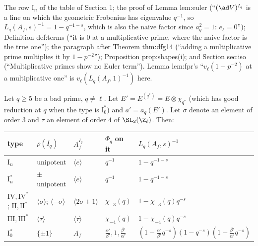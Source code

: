 \begin{paperlink}
The row $\mathrm I_n$ of the table of Section 1; the proof of Lemma lem:euler (``$(\ad V)^{I_q}$ is a line on which the geometric Frobenius has eigenvalue $q^{-1}$, so
$L_q(A_f,s)^{-1}=1-q^{-1-s}$, which is also the naive factor since $a_q^2=1$: $e_\ell=0$''); Definition def:terms (``it is $0$ at a multiplicative prime, where the naive
factor is the true one''); the paragraph after Theorem thm:dfg14 (``adding a multiplicative prime multiplies it by $1-p^{-2}$''); Proposition prop:shapes(i); and Section
sec:iso (``Multiplicative primes show no Euler term''). Lemma lem:fpr's ``$v_\ell(1-p^{-2})$ at a multiplicative one'' is $v_\ell(L_q(A_f,1)^{-1})$ here.
\end{paperlink}

\begin{lemma}\label{lem:lfunctions:euler}
Let $q\ge5$ be a bad prime, $q\ne\ell$. Let $E'=E^{(q^*)}=E\otimes\chi_{q^*}$ (which has good reduction at $q$ when the type is $\mathrm I_0^*$) and $a'=a_q(E')$. Let $\sigma$ denote an element
of order $3$ and $\tau$ an element of order $4$ of $\SL_2(\Z_\ell)$. Then:
\begin{center}\footnotesize\setlength{\tabcolsep}{4pt}
\begin{tabular}{lllll}
\toprule
type & $\rho(I_q)$ & $A_f^{I_q}$ & $\Phi_q$ on it & $L_q(A_f,s)^{-1}$\\
\midrule
$\mathrm I_n$ & unipotent & $\langle e\rangle$ & $q^{-1}$ & $1-q^{-1-s}$\\
$\mathrm I_n^*$ & $\pm$unipotent & $\langle e\rangle$ & $q^{-1}$ & $1-q^{-1-s}$\\
$\mathrm{IV},\mathrm{IV}^*$; $\mathrm{II},\mathrm{II}^*$ & $\langle\sigma\rangle$; $\langle-\sigma\rangle$ & $\langle2\sigma+1\rangle$ & $\chi_{-3}(q)$ & $1-\chi_{-3}(q)q^{-s}$\\
$\mathrm{III},\mathrm{III}^*$ & $\langle\tau\rangle$ & $\langle\tau\rangle$ & $\chi_{-4}(q)$ & $1-\chi_{-4}(q)q^{-s}$\\
$\mathrm I_0^*$ & $\{\pm1\}$ & $A_f$ & $\frac{\alpha'}{\beta'},1,\frac{\beta'}{\alpha'}$ & $(1-\frac{\alpha'}{\beta'}q^{-s})(1-q^{-s})(1-\frac{\beta'}{\alpha'}q^{-s})$\\
\bottomrule
\end{tabular}


\end{center}
\end{lemma}
